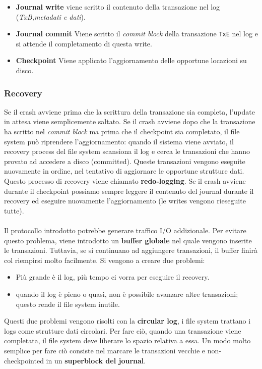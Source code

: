 \documentclass[12pt, twoside, letterpaper]{article}
\begin{document}
				\begin{itemize}
					\item \textbf{Journal write} viene scritto il contenuto della transazione nel log (\textit{TxB,metadati e dati}).
					\item \textbf{Journal commit} Viene scritto il \textit{commit block }della transazione \texttt{TxE} nel log e si attende il completamento di questa write.
					\item \textbf{Checkpoint} Viene applicato l'aggiornamento delle opportune locazioni su disco.
				\end{itemize}		
			
			\subsubsection{Recovery}	
				Se il crash avviene prima che la scrittura della transazione sia completa, l'update in attesa viene semplicemente saltato. Se il crash avviene dopo che la transazione ha scritto nel \textit{commit block} ma prima che il checkpoint sia completato, il file system può riprendere l'aggiornamento: quando il sistema viene avviato, il recovery process del file system scansiona il log e cerca le transazioni che hanno provato ad accedere a disco (committed). Queste transazioni vengono eseguite nuovamente in ordine, nel tentativo di aggiornare le opportune strutture dati. Questo processo di recovery viene chiamato \textbf{redo-logging}. Se il crash avviene durante il checkpoint possiamo sempre leggere il contenuto del journal durante il recovery ed eseguire nuovamente l'aggiornamento (le writes vengono rieseguite tutte).\\\\
				Il protocollo introdotto potrebbe generare traffico I/O addizionale. Per evitare questo problema, viene introdotto un \textbf{buffer globale} nel quale vengono inserite le transazioni. Tuttavia, se si continuano ad aggiungere transazioni, il buffer finirà col riempirsi molto facilmente. Si vengono a creare due problemi: 
				\begin{itemize}
					\item Più grande è il log, più tempo ci vorra per eseguire il recovery.
					\item quando il log è pieno o quasi, non è possibile avanzare altre transazioni; questo rende il file system inutile.
				\end{itemize}
				Questi due problemi vengono risolti con la \textbf{circular log}, i file system trattano i logs come strutture dati circolari. Per fare ciò, quando una transazione viene completata, il file system deve liberare lo spazio relativa a essa. Un modo molto semplice per fare ciò consiste nel marcare le transazioni vecchie e non-checkpointed in un \textbf{superblock del journal}.
\end{document}
